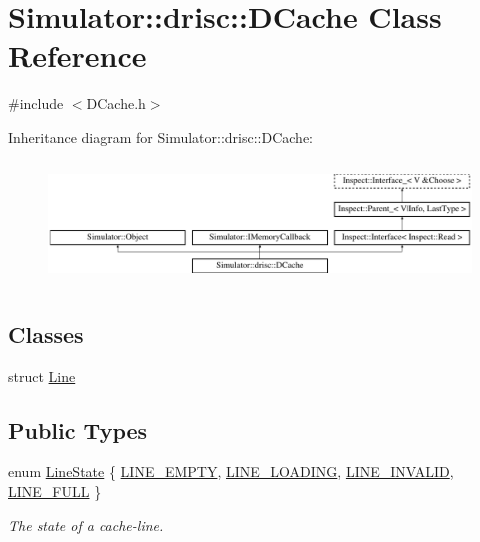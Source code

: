 \hypertarget{class_simulator_1_1drisc_1_1_d_cache}{\section{Simulator\+:\+:drisc\+:\+:D\+Cache Class Reference}
\label{class_simulator_1_1drisc_1_1_d_cache}
}


{\ttfamily \#include $<$D\+Cache.\+h$>$}

Inheritance diagram for Simulator\+:\+:drisc\+:\+:D\+Cache\+:\begin{figure}[H]
\begin{center}
\leavevmode
\includegraphics[height=3.289281cm]{class_simulator_1_1drisc_1_1_d_cache}
\end{center}
\end{figure}
\subsection*{Classes}
\begin{DoxyCompactItemize}
\item 
struct \hyperlink{struct_simulator_1_1drisc_1_1_d_cache_1_1_line}{Line}
\end{DoxyCompactItemize}
\subsection*{Public Types}
\begin{DoxyCompactItemize}
\item 
enum \hyperlink{class_simulator_1_1drisc_1_1_d_cache_aab0700229ca4e63558dd73cb40ee0b71}{Line\+State} \{ \hyperlink{class_simulator_1_1drisc_1_1_d_cache_aab0700229ca4e63558dd73cb40ee0b71a6492d0c4b09bbaf85d7848638e1b9e4a}{L\+I\+N\+E\+\_\+\+E\+M\+P\+T\+Y}, 
\hyperlink{class_simulator_1_1drisc_1_1_d_cache_aab0700229ca4e63558dd73cb40ee0b71abf88e2ea7fe762928686a9b2b3c44f9a}{L\+I\+N\+E\+\_\+\+L\+O\+A\+D\+I\+N\+G}, 
\hyperlink{class_simulator_1_1drisc_1_1_d_cache_aab0700229ca4e63558dd73cb40ee0b71a46f24a3cab8cf50fd5e27e58d4b469f1}{L\+I\+N\+E\+\_\+\+I\+N\+V\+A\+L\+I\+D}, 
\hyperlink{class_simulator_1_1drisc_1_1_d_cache_aab0700229ca4e63558dd73cb40ee0b71a9d8e8c623920edff8b10d6b07f5eee8a}{L\+I\+N\+E\+\_\+\+F\+U\+L\+L}
 \}
\begin{DoxyCompactList}\small\item\em The state of a cache-\/line. \end{DoxyCompactList}\end{DoxyCompactItemize}
